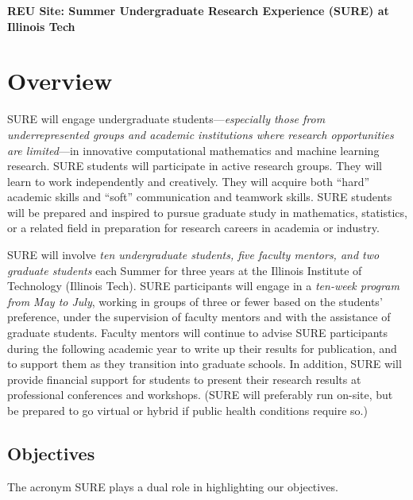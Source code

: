 \documentclass[11pt]{NSFamsart}
\begin{document}

\begin{center}
\Large 
\textbf{REU Site: Summer Undergraduate Research Experience (SURE) at Illinois Tech}
\end{center}



\section{Overview} 

SURE will engage undergraduate students---\emph{especially those from underrepresented groups and academic institutions where research opportunities are limited}---in innovative computational mathematics and machine learning research.  SURE students will participate in active research groups.  They will learn to work independently and creatively. They will acquire both ``hard'' academic skills and ``soft'' communication and teamwork skills.  SURE students will be prepared and inspired to pursue graduate study in mathematics, statistics, or a related field in preparation for research careers in academia or industry.

SURE will involve \emph{ten undergraduate students, five faculty mentors, and two graduate students} each Summer for three years at the Illinois Institute of Technology (Illinois Tech).  SURE participants will engage in a \emph{ten-week program from May to July}, working in groups of three or fewer based on the students’ preference, under the supervision of faculty mentors and with the assistance of graduate students. Faculty mentors will continue to advise SURE participants during the following academic year to write up their results for publication, and to support them as they transition into graduate schools. In addition, SURE will provide financial support for students to present their research results at professional conferences and workshops.
(SURE will preferably run on-site, but be prepared to go virtual or hybrid if public health conditions require so.)

\subsection{Objectives} The acronym SURE plays a dual role in highlighting our objectives.
\end{document}
